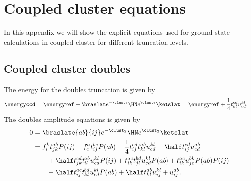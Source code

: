 \chapter{Coupled cluster equations}
    In this appendix we will show the explicit equations used for ground state
    calculations in coupled cluster for different truncation levels.

    \section{Coupled cluster doubles}
        The energy for the doubles truncation is given by
        \begin{align}
            \energyccd
            &= \energyref
            + \braslat e^{-\clust_2}\HN e^{\clust_2}\ketslat
            = \energyref
            + \frac{1}{4}t^{cd}_{kl} u^{kl}_{cd}.
        \end{align}
        The doubles amplitude equations is given by
        \begin{align}
            0 &= \braslate{ab}{ij}e^{-\clust_2}\HN e^{\clust_2}\ketslat
            \\
            &=
            f^{k}_{i} t^{ab}_{jk} P(ij)
            - f^{a}_{c} t^{bc}_{ij} P(ab)
            + \frac{1}{4} t^{cd}_{ij} t^{ab}_{kl} u^{kl}_{cd}
            + \half t^{cd}_{ij} u^{ab}_{cd}
            \nonumber \\
            &\qquad
            + \half t^{cd}_{jk} t^{ab}_{il} u^{kl}_{cd} P(ij)
            + t^{ac}_{ik} t^{bd}_{jl} u^{kl}_{cd} P(ab)
            + t^{ac}_{ik} u^{bk}_{jc} P(ab) P(ij)
            \nonumber \\
            &\qquad
            - \half t^{ac}_{ij} t^{bd}_{kl} u^{kl}_{cd} P(ab)
            + \half t^{ab}_{kl} u^{kl}_{ij}
            + u^{ab}_{ij}.
        \end{align}

